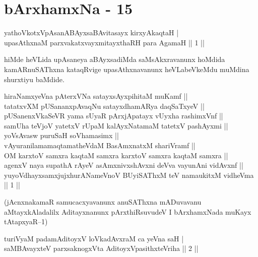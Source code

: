 \chapter{bArxhamxNa - 15}


\begin{shl}
yathoVkotxVpAsanABAyxsaBAvitasayx kirxyAkaqtaH | \\
upasAthxnaM parxvakatxvayxmitayxthaRH para AgamaH \hfill||  1 || 
\end{shl}

\begin{artha} 
hiMde heVLida upAsaneya aBAyxsadiMda saMsAkxravanunx hoMdida 
kamARnuSAThxna kataqRvige upasAthxnavanunx heVLabeVkeMdu muMdina 
shurxtiyu baMdide.\\
\begin{kandikeshl}
hiraNamxyeVna pAterxVNa satayxsAyxpihitaM muKamf ||\\ tatatxvXM pUSananxpAvaqNu satayxdhamARya daqSaTxyeV ||\\pUSanenxVkaSeVR yama sUyaR pArxjApatayx vUyxha rashimxVnf ||\\samUha teVjoV yatetxV rUpaM kalAyxNatamaM tatetxV pashAyxmi ||\\ yoV\s sAvasw puruSaH soV\s hamasimx ||\\ vAyuranilamamaqtamatheVdaM BasAmxnatxM shariVramf ||\\ OM karxtoV samxra kaqtaM samxra karxtoV samxra kaqtaM samxra ||\\ agenxV naya supathA rAyeV asAmxnivxshAvxni deVva vayunAni vidAvxnf ||\\ yuyoVdhayxsamxjujxhurANameVnoV BUyiSAThxM teV namaukitxM vidheVma || 1 ||
\end{kandikeshl}
(jAcnxnakamaR samucacxyavanunx anuSAThxna mADuvavanu aMtayxkAladalilx 
Aditayxnanunx pArxthiRsuvudeV I bArxhamxNada muKayx tAtapxyaR{\rm --}1)
\end{artha}


\begin{shl}
turiVyaM padamAditoyxV loVkadAvxraM ca yeVna saH | \\
saMBAvayxteV parxsaknogxV\s ta AditoyxVpasithxteVriha \hfill||  2 || 
\end{shl}

